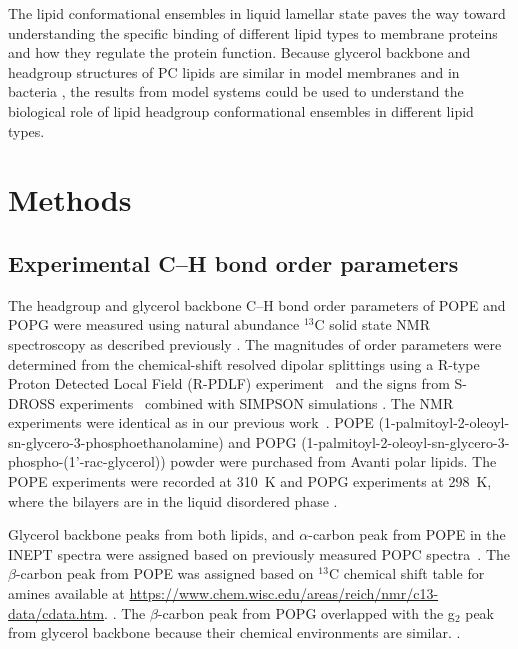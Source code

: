 \documentclass[aps,prl,superscriptaddress,twocolumn]{revtex4}
\begin{document}
The lipid conformational ensembles in liquid lamellar state paves the way toward understanding the
specific binding of different lipid types to membrane proteins and how they regulate the protein function.
Because glycerol backbone and headgroup structures of PC lipids are similar in model membranes and in bacteria \cite{gally81,scherer87,seelig90},
the results from model systems could be used to understand the biological role of lipid headgroup conformational ensembles in different lipid types.



\section{Methods}
\subsection{Experimental C--H bond order parameters}
The headgroup and glycerol backbone C--H bond order parameters of POPE and POPG
were measured using natural abundance $^{13}$C solid state NMR spectroscopy
as described previously \cite{ferreira13,ferreira16}.
The magnitudes of order parameters were determined from the chemical-shift resolved dipolar splittings
using a R-type Proton Detected Local Field (R-PDLF) experiment~\cite{dvinskikh04} and
the signs from S-DROSS experiments~\cite{gross97} combined with SIMPSON simulations \cite{bak00}.
The NMR experiments were identical as in our previous work~\cite{antila19}.
POPE (1-palmitoyl-2-oleoyl-sn-glycero-3-phosphoethanolamine) and POPG (1-palmitoyl-2-oleoyl-sn-glycero-3-phospho-(1'-rac-glycerol)) powder were purchased from Avanti polar lipids. The POPE experiments were recorded at 310~K and POPG experiments at 298~K, where the bilayers are in the liquid disordered phase \cite{marsh13}.

Glycerol backbone peaks from both lipids, and $\alpha$-carbon peak from POPE in the INEPT spectra 
were assigned based on previously measured POPC spectra~\cite{ferreira13}.
The $\beta$-carbon peak from POPE was assigned based on $^{13}$C chemical shift table for amines available
at \url{https://www.chem.wisc.edu/areas/reich/nmr/c13-data/cdata.htm}.
.
The $\beta$-carbon peak from POPG overlapped with the g$_2$ peak from glycerol backbone
because their chemical environments are similar.
.
\end{document}
